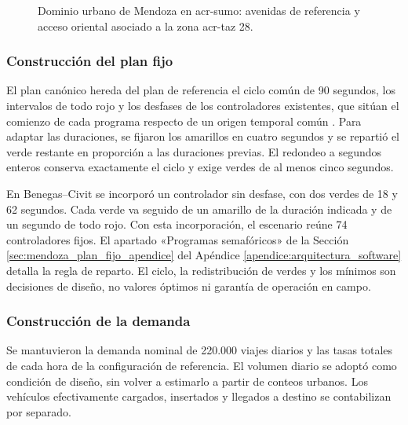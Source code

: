\begin{figure}[H]
\centering

\caption[Dominio urbano de Mendoza: avenidas de referencia y acceso TAZ 28.]{Dominio urbano de Mendoza en \acrshort{acr-sumo}: avenidas de referencia y acceso oriental asociado a la zona \acrshort{acr-taz} 28.}
\label{fig:dominio_mendoza}
\end{figure}

\subsubsection{Construcción del plan fijo}
\label{subsubsec:mendoza_plan_fijo}

El plan canónico hereda del plan de referencia el ciclo común de 90 segundos, los intervalos de todo rojo y los desfases de los controladores existentes, que sitúan el comienzo de cada programa respecto de un origen temporal común \cite[cap.~6]{fhwa_signal_timing_manual}. Para adaptar las duraciones, se fijaron los amarillos en cuatro segundos y se repartió el verde restante en proporción a las duraciones previas. El redondeo a segundos enteros conserva exactamente el ciclo y exige verdes de al menos cinco segundos.

En Benegas--Civit se incorporó un controlador sin desfase, con dos verdes de 18 y 62 segundos. Cada verde va seguido de un amarillo de la duración indicada y de un segundo de todo rojo. Con esta incorporación, el escenario reúne 74 controladores fijos. El apartado «Programas semafóricos» de la Sección \ref{sec:mendoza_plan_fijo_apendice} del Apéndice \ref{apendice:arquitectura_software} detalla la regla de reparto. El ciclo, la redistribución de verdes y los mínimos son decisiones de diseño, no valores óptimos ni garantía de operación en campo.

\subsubsection{Construcción de la demanda}
\label{subsubsec:mendoza_demanda_dinamica}

Se mantuvieron la demanda nominal de 220.000 viajes diarios y las tasas totales de cada hora de la configuración de referencia. El volumen diario se adoptó como condición de diseño, sin volver a estimarlo a partir de conteos urbanos. Los vehículos efectivamente cargados, insertados y llegados a destino se contabilizan por separado.

